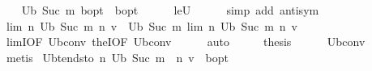 \begin{isabellebody}
\ \ \isamarkupfalse%
\ {\isachardoublequoteopen}U\isactrlsub b\ {\isacharparenleft}{\kern0pt}Suc\ m{\isacharparenright}{\kern0pt}\ {\isasymnu}\isactrlsub b{\isacharunderscore}{\kern0pt}opt\ {\isacharequal}{\kern0pt}\ {\isasymnu}\isactrlsub b{\isacharunderscore}{\kern0pt}opt{\isachardoublequoteclose}\isanewline
\ \ \ \ \isamarkupfalse%
\ le{\isacharunderscore}{\kern0pt}U\isanewline
\ \ \ \ \isamarkupfalse%
\ {\isacharparenleft}{\kern0pt}simp\ add{\isacharcolon}{\kern0pt}\ antisym{\isacharparenright}{\kern0pt}\isanewline
\ \ \isamarkupfalse%
\ \isamarkupfalse%
\ {\isachardoublequoteopen}{\isacharparenleft}{\kern0pt}lim\ {\isacharparenleft}{\kern0pt}{\isasymlambda}n{\isachardot}{\kern0pt}\ {\isacharparenleft}{\kern0pt}U\isactrlsub b\ {\isacharparenleft}{\kern0pt}Suc\ m{\isacharparenright}{\kern0pt}\ {\isacharcircum}{\kern0pt}{\isacharcircum}{\kern0pt}n{\isacharparenright}{\kern0pt}\ v{\isacharparenright}{\kern0pt}{\isacharparenright}{\kern0pt}\ {\isacharequal}{\kern0pt}\ U\isactrlsub b\ {\isacharparenleft}{\kern0pt}Suc\ m{\isacharparenright}{\kern0pt}\ {\isacharparenleft}{\kern0pt}lim\ {\isacharparenleft}{\kern0pt}{\isasymlambda}n{\isachardot}{\kern0pt}\ {\isacharparenleft}{\kern0pt}U\isactrlsub b\ {\isacharparenleft}{\kern0pt}Suc\ m{\isacharparenright}{\kern0pt}\ {\isacharcircum}{\kern0pt}{\isacharcircum}{\kern0pt}n{\isacharparenright}{\kern0pt}\ v{\isacharparenright}{\kern0pt}{\isacharparenright}{\kern0pt}{\isachardoublequoteclose}\isanewline
\ \ \ \ \isamarkupfalse%
\ limI{\isacharbrackleft}{\kern0pt}OF\ U\isactrlsub b{\isacharunderscore}{\kern0pt}conv{\isacharparenleft}{\kern0pt}{}{\isacharparenright}{\kern0pt}{\isacharbrackright}{\kern0pt}\ theI{\isacharprime}{\kern0pt}{\isacharbrackleft}{\kern0pt}OF\ U\isactrlsub b{\isacharunderscore}{\kern0pt}conv{\isacharparenleft}{\kern0pt}{}{\isacharparenright}{\kern0pt}{\isacharbrackright}{\kern0pt}\isanewline
\ \ \ \ \isamarkupfalse%
\ auto\isanewline
\ \ \isamarkupfalse%
\ \isamarkupfalse%
\ {\isacharquery}{\kern0pt}thesis\isanewline
\ \ \ \ \isamarkupfalse%
\ U\isactrlsub b{\isacharunderscore}{\kern0pt}conv{\isacharparenleft}{\kern0pt}{}{\isacharparenright}{\kern0pt}\isanewline
\ \ \ \ \isamarkupfalse%
\ metis\isanewline
{}\isamarkupfalse%
%
\endisatagproof
{\isafoldproof}%
%
\isadelimproof
\isanewline
%
\endisadelimproof
\isanewline
{}\isamarkupfalse%
\ U\isactrlsub b{\isacharunderscore}{\kern0pt}tendsto{\isacharcolon}{\kern0pt}\ {\isachardoublequoteopen}{\isacharparenleft}{\kern0pt}{\isasymlambda}n{\isachardot}{\kern0pt}\ {\isacharparenleft}{\kern0pt}U\isactrlsub b\ {\isacharparenleft}{\kern0pt}Suc\ m{\isacharparenright}{\kern0pt}\ {\isacharcircum}{\kern0pt}{\isacharcircum}{\kern0pt}\ n{\isacharparenright}{\kern0pt}\ v{\isacharparenright}{\kern0pt}\ {\isasymlonglonglongrightarrow}\ {\isasymnu}\isactrlsub b{\isacharunderscore}{\kern0pt}opt{\isachardoublequoteclose}\isanewline

\end{isabellebody}
